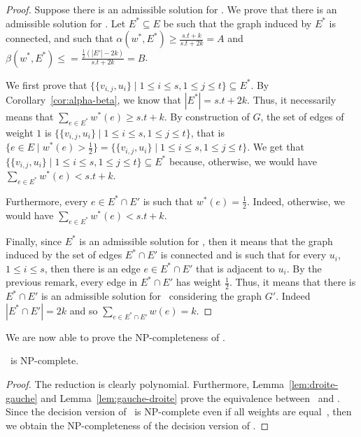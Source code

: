 \begin{proof}
Suppose there is an admissible solution for \PROBLEM.
We prove that there is an admissible solution for \STEINER.
Let $E^* \subseteq E$ be such that the graph induced by $E^*$ is
connected, and such that $\alpha(w^{*},E^*) \geq
\frac{s.t+k}{s.t+2k} = A$ and $\beta(w^{*},E^*) \leq =
\frac{\frac{1}{2}(|E'|-2k)}{s.t+2k} = B$.

We first prove that $\{\{v_{i,j},u_{i}\} \mid 1 \leq i \leq s, 1 \leq j \leq
t\} \subseteq E^*$.
By Corollary~\ref{cor:alpha-beta}, we know that $|E^*| = s.t + 2k$.
Thus, it necessarily means that $\sum_{e \in E^*} w^*(e) \geq s.t
+ k$.
By construction of $G$, the set of edges of weight $1$ is $\{\{v_{i,j},u_{i}\} \mid 1 \leq i \leq s, 1 \leq j \leq
t\}$, that is $\{e \in E \mid w^*(e) > \frac{1}{2}\} =
\{\{v_{i,j},u_{i}\} \mid 1 \leq i \leq s, 1 \leq j \leq t\}$.
We get that $\{\{v_{i,j},u_{i}\} \mid 1 \leq i \leq s, 1 \leq j \leq
t\} \subseteq E^*$ because, otherwise, we would have $\sum_{e \in E^*} w^*(e) < s.t
+ k$.

Furthermore, every $e \in E^* \cap E'$ is such that
$w^*(e) = \frac{1}{2}$.
Indeed, otherwise, we would have $\sum_{e \in E^*} w^*(e) < s.t
+ k$.

Finally, since $E^*$ is an admissible solution for \PROBLEM,
then it means that the graph induced by the set of edges $E^* \cap
E'$ is connected and is such that for every $u_{i}$, $1 \leq i \leq
s$, then there is an edge $e \in E^* \cap E'$ that is adjacent to
$u_{i}$.
By the previous remark, every edge in $E^* \cap E'$ has weight
$\frac{1}{2}$.
Thus, it means that there is $E^* \cap E'$ is an admissible solution
for \STEINER~considering the graph $G'$.
Indeed $|E^* \cap E'| = 2k$ and so $\sum_{e \in E^* \cap E'}w(e)
= k$.
\end{proof}



We are now able to prove the NP-completeness of \PROBLEM.

\begin{theorem}
\label{the:NP-complete-with-Steiner}
\PROBLEM~is NP-complete.
\end{theorem}
\begin{proof}
The reduction is clearly polynomial.
Furthermore, Lemma~\ref{lem:droite-gauche} and
Lemma~\ref{lem:gauche-droite} prove the equivalence between
\PROBLEM~and \STEINER.
Since the decision version of \STEINER~is NP-complete even if all weights are
equal~\cite{Garey1979}, then we obtain the NP-completeness of the
decision version of \PROBLEM.
\end{proof}

